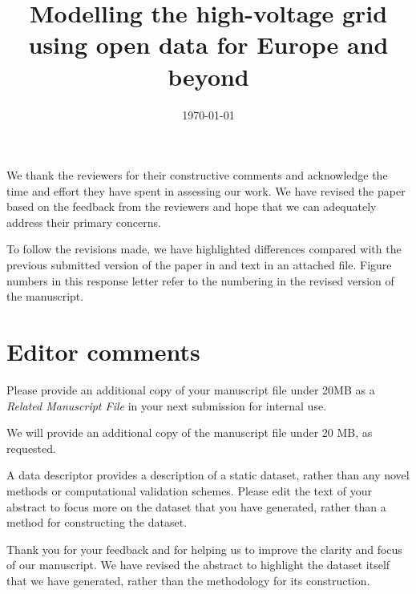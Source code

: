 \documentclass{response}
\title{Modelling the high-voltage grid using open data for Europe and beyond}
\date{\today}
\begin{document}
 

\maketitle 

We thank the reviewers for their constructive comments and acknowledge the time
and effort they have spent in assessing our work. We have revised the paper
based on the feedback from the reviewers and hope that we can adequately address
their primary concerns.

To follow the revisions made, we have highlighted differences compared with the
previous submitted version of the paper in {\color{blue}{blue}} and
{\color{red}{red}} text in an attached file. Figure numbers in this response letter
refer to the numbering in the revised version of the manuscript.

\section*{Editor comments}

\EC Please provide an additional copy of your manuscript file under 20MB as a \textit{Related Manuscript File} in your next submission for internal use.

\AR We will provide an additional copy of the manuscript file under 20 MB, as requested.

\EC A data descriptor provides a description of a static dataset, rather than any novel methods or computational validation schemes. Please edit the text of your abstract to focus more on the dataset that you have generated, rather than a method for constructing the dataset.

\AR Thank you for your feedback and for helping us to improve the clarity and focus of our manuscript. We have revised the abstract to highlight the dataset itself that we have generated, rather than the methodology for its construction.
\end{document}
